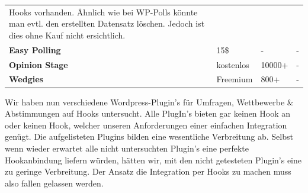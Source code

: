 \begin{longtable}[c]{@{}llll@{}}
\begin{minipage}[t]{0.33\columnwidth}
Hooks vorhanden. Ähnlich wie bei WP-Polls könnte man evtl. den
erstellten Datensatz löschen. Jedoch ist dies ohne Kauf nicht
ersichtlich.
\strut\end{minipage}\tabularnewline
\begin{minipage}[t]{0.24\columnwidth}\raggedright\strut
\textbf{Easy Polling}
\strut\end{minipage} &
\begin{minipage}[t]{0.12\columnwidth}\raggedright\strut
15\$
\strut\end{minipage} &
\begin{minipage}[t]{0.20\columnwidth}\raggedright\strut
-
\strut\end{minipage} &
\begin{minipage}[t]{0.33\columnwidth}\raggedright\strut
-
\strut\end{minipage}\tabularnewline
\begin{minipage}[t]{0.24\columnwidth}\raggedright\strut
\textbf{Opinion Stage}
\strut\end{minipage} &
\begin{minipage}[t]{0.12\columnwidth}\raggedright\strut
kostenlos
\strut\end{minipage} &
\begin{minipage}[t]{0.20\columnwidth}\raggedright\strut
10000+
\strut\end{minipage} &
\begin{minipage}[t]{0.33\columnwidth}\raggedright\strut
-
\strut\end{minipage}\tabularnewline
\begin{minipage}[t]{0.24\columnwidth}\raggedright\strut
\textbf{Wedgies}
\strut\end{minipage} &
\begin{minipage}[t]{0.12\columnwidth}\raggedright\strut
Freemium
\strut\end{minipage} &
\begin{minipage}[t]{0.20\columnwidth}\raggedright\strut
800+
\strut\end{minipage} &
\begin{minipage}[t]{0.33\columnwidth}\raggedright\strut
-
\strut\end{minipage}\tabularnewline
\bottomrule
\end{longtable}

Wir haben nun verschiedene Wordpress-Plugin's für Umfragen, Wettbewerbe
\& Abstimmungen auf Hooks untersucht. Alle PlugIn's bieten gar keinen
Hook an oder keinen Hook, welcher unseren Anforderungen einer einfachen
Integration genügt. Die aufgelisteten Plugins bilden eine wesentliche
Verbreitung ab. Selbst wenn wieder erwartet alle nicht untersuchten
Plugin's eine perfekte Hookanbindung liefern würden, hätten wir, mit den
nicht getesteten Plugin's eine zu geringe Verbreitung. Der Ansatz die
Integration per Hooks zu machen muss also fallen gelassen werden.

